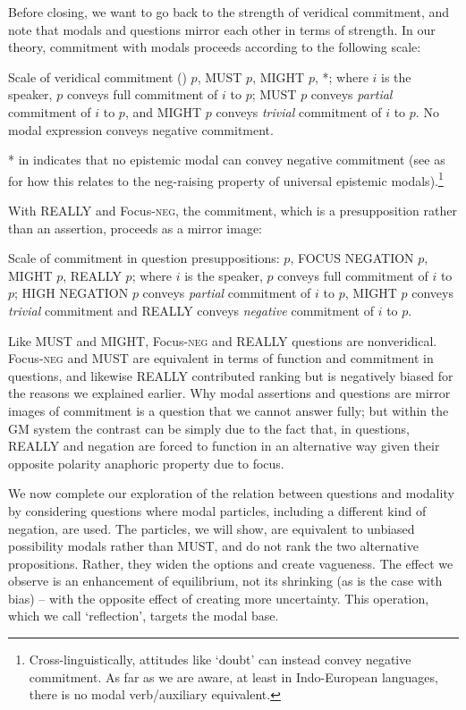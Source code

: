 \documentclass[output=paper,colorlinks,citecolor=brown]{langscibook}
\begin{document}
Before closing, we want to go back to the strength of veridical commitment, and note  that modals and questions mirror each other in terms of strength. In our theory, commitment with modals proceeds according to the following scale: 

\ea \label{VerCom} Scale of veridical commitment (\citealt{giannakidoumari2016, giannakidoumari2018b, giannakidoumari2021a, giannakidoumari2021b})
\sn {\textlangle}$p$, \textsc{MUST} $p$, \textsc{MIGHT} $p$, *{\textrangle};
\sn where $i$ is the speaker, $p$ conveys full commitment of $i$ to $p$; \textsc{MUST} $p$ conveys \textit{partial} commitment of $i$ to $p$, and \textsc{MIGHT} $p$ conveys \textit{trivial} commitment of $i$ to $p$. No modal expression conveys negative commitment. 
\z	 

* in  indicates that no epistemic modal can convey negative commitment (see \citealt{ernst2009, homer2015, giannakidoumari2018b} as for how this relates to the neg-raising property of universal epistemic modals).\footnote{Cross-linguistically, attitudes like `doubt' can instead convey negative commitment. As far as we are aware, at least in Indo-European languages, there is no modal verb/auxiliary equivalent.}

With \textsc{REALLY} and Focus-\textsc{neg}, the commitment, which is a presupposition rather than an assertion, proceeds as a mirror image: 

\ea Scale of  commitment in question presuppositions: 
\sn {\textlangle}$p$, FOCUS NEGATION $p$, MIGHT $p$, REALLY $p${\textrangle};
\sn where $i$ is the speaker, $p$ conveys full commitment of $i$ to $p$; HIGH NEGATION $p$ conveys \textit{partial} commitment of $i$ to $p$, MIGHT $p$ conveys \textit{trivial} commitment and REALLY conveys \textit{negative} commitment of $i$ to $p$.
\z

Like \textsc{MUST} and \textsc{MIGHT}, Focus-\textsc{neg} and \textsc{REALLY} questions are nonveridical. Focus-\textsc{neg} and \textsc{MUST} are equivalent in terms of function and commitment in questions, and likewise \textsc{REALLY} contributed ranking but is negatively biased for the reasons we explained earlier. Why modal assertions and questions are mirror images of commitment is a question that we cannot answer fully; but within the GM system the contrast can be simply due to the fact that, in questions, \textsc{REALLY} and negation are forced to function in an alternative way given their opposite polarity anaphoric property due to focus. 


We now complete our exploration of the relation between questions and modality by considering questions where modal particles, including a different kind of negation, are used. The particles, we will show, are equivalent to unbiased possibility modals rather than \textsc{MUST}, and do not rank the two alternative propositions. Rather, they  widen the options and create  vagueness. The effect we observe is an enhancement of equilibrium, not its shrinking (as is the case with bias) --  with the opposite effect of creating more uncertainty.  This operation, which we call `reflection', targets the modal base.
\end{document}
